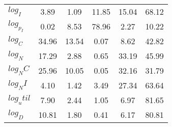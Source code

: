 \begin{center}
\begin{longtable}{lccccc}
$log_I     $	 & 	        3.89	 & 	        1.09	 & 	       11.85	 & 	       15.04	 & 	       68.12 \\ 
$log_p_I   $	 & 	        0.02	 & 	        8.53	 & 	       78.96	 & 	        2.27	 & 	       10.22 \\ 
$log_C     $	 & 	       34.96	 & 	       13.54	 & 	        0.07	 & 	        8.62	 & 	       42.82 \\ 
$log_N     $	 & 	       17.29	 & 	        2.88	 & 	        0.65	 & 	       33.19	 & 	       45.99 \\ 
$log_NC    $	 & 	       25.96	 & 	       10.05	 & 	        0.05	 & 	       32.16	 & 	       31.79 \\ 
$log_NI    $	 & 	        4.10	 & 	        1.42	 & 	        3.49	 & 	       27.34	 & 	       63.64 \\ 
$log_util  $	 & 	        7.90	 & 	        2.44	 & 	        1.05	 & 	        6.97	 & 	       81.65 \\ 
$log_D     $	 & 	       10.81	 & 	        1.80	 & 	        0.41	 & 	        6.17	 & 	       80.81 \\ 
\end{longtable}
 \end{center}
